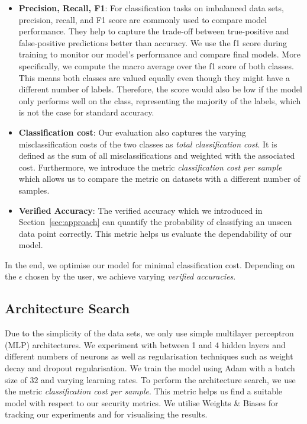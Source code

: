 \documentclass[acmsmall,nonacm]{acmart}
\begin{document}
\begin{itemize}
	\item \textbf{Precision, Recall, F1}: For classification tasks on imbalanced data sets, precision, recall, and F1 score are commonly used to compare model performance. They help to capture the trade-off between true-positive and false-positive predictions better than accuracy. We use the f1 score during training to monitor our model's performance and compare final models. More specifically, we compute the macro average over the f1 score of both classes. This means both classes are valued equally even though they might have a different number of labels. Therefore, the score would also be low if the model only performs well on the class, representing the majority of the labels, which is not the case for standard accuracy.
	\item \textbf{Classification cost}: Our evaluation also captures the varying misclassification costs of the two classes as \textit{total classification cost}. It is defined as the sum of all misclassifications and weighted with the associated cost. Furthermore, we introduce the metric \textit{classification cost per sample} which allows us to compare the metric on datasets with a different number of samples. 
	\item \textbf{Verified Accuracy}: The verified accuracy which we introduced in Section~\ref{sec:approach} can quantify the probability of classifying an unseen data point correctly. This metric helps us evaluate the dependability of our model.
\end{itemize}

In the end, we optimise our model for minimal classification cost. Depending on the $\epsilon$ chosen by the user, we achieve varying \textit{verified accuracies}.

\subsection{Architecture Search}
Due to the simplicity of the data sets, we only use simple multilayer perceptron (MLP) architectures. We experiment with between 1 and 4 hidden layers and different numbers of neurons as well as regularisation techniques such as weight decay and dropout regularisation. We train the model using Adam with a batch size of 32 and varying learning rates. To perform the architecture search, we use the metric \textit{classification cost per sample}. This metric helps us find a suitable model with respect to our security metrics. We utilise Weights \& Biases \cite{wandb} for tracking our experiments and for visualising the results. 
\end{document}
